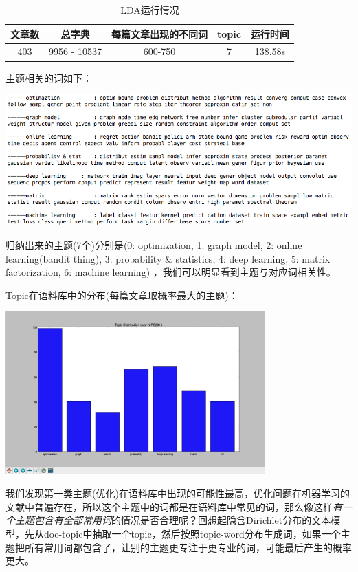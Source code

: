 \documentclass{article}
\begin{document}
\begin{center}
\begin{table}[!ht]
\centering
\caption{LDA运行情况}
\large
\begin{tabular}{|c|c|c|c|c|}
\hline
文章数 & 总字典 & 每篇文章出现的不同词 & topic &运行时间\\
\hline
403 & 9956 - 10537 & 600-750 & 7 & 138.58s\\
\hline
\end{tabular}
\end{table}
\end{center}


主题相关的词如下：
\begin{center}
	\includegraphics[width=15cm]{result/v2.0/result2}
\end{center}

归纳出来的主题(7个)分别是(0: optimization, 1: graph model, 2: online learning(bandit thing), 3: probability \& statistics, 4: deep learning, 5: matrix factorization, 6: machine learning)
，我们可以明显看到主题与对应词相关性。

Topic在语料库中的分布(每篇文章取概率最大的主题)：
\begin{center}
	\includegraphics[width=10cm]{result/v2.0/topic-distribution}
\end{center}

我们发现第一类主题(优化)在语料库中出现的可能性最高，优化问题在机器学习的文献中普遍存在，所以这个主题中的词都是在语料库中常见的词，那么像这样\emph{有一个主题包含有全部常用词}的情况是否合理呢？回想起隐含Dirichlet分布的文本模型，先从doc-topic中抽取一个topic，然后按照topic-word分布生成词，如果一个主题把所有常用词都包含了，让别的主题更专注于更专业的词，可能最后产生的概率更大。
\end{document}
